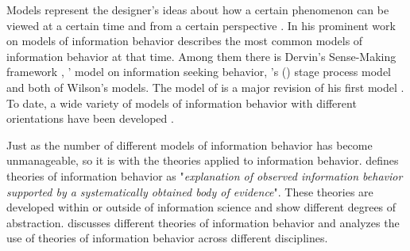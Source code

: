 \documentclass[12pt, a4paper, titlepage, oneside, abstract=true, toc=listof, toc=bibliography, BCOR=1cm]{scrreprt}
\begin{document}
Models represent the designer's ideas about how a certain phenomenon can be viewed at a certain time and from a certain perspective \citep[p. 142]{Ford2015}.  In his prominent work on models of information behavior \citet{Wilson1999} describes the most common models of information behavior at that time. Among them there is Dervin's Sense-Making framework \citep{Dervin2015}, \citet{Ellis1989}' model on information seeking behavior, \citeauthor{Kuhlthau1991}'s (\citeyear{Kuhlthau1991}) stage process model and both of Wilson's models. The model of \citet{Wilson1996} is a major revision of his first model \citep{Wilson1981}. To date, a wide variety of models of information behavior with different orientations have been developed \citep[e.g.][]{Godbold2006, Nesset2014, Robson2013, Shenton2012}. 

Just as the number of different models of information behavior has become unmanageable, so it is with the theories applied to information behavior. \citet[p. 149]{Ford2015} defines theories of information behavior as "\textit{explanation of observed information behavior supported by a systematically obtained body of evidence}". These theories are developed within \citep[e.g.][]{Dervin2015, Fisher2006, Talja2005a, Tuominen2005} or outside \citep[e.g.][]{Dalmer2018, Wilson2006} of information science and show different degrees of abstraction. \citet{Fisher2005} discusses different theories of information behavior and \citet{Wilson2018} analyzes the use of theories of information behavior across different disciplines.
\end{document}
